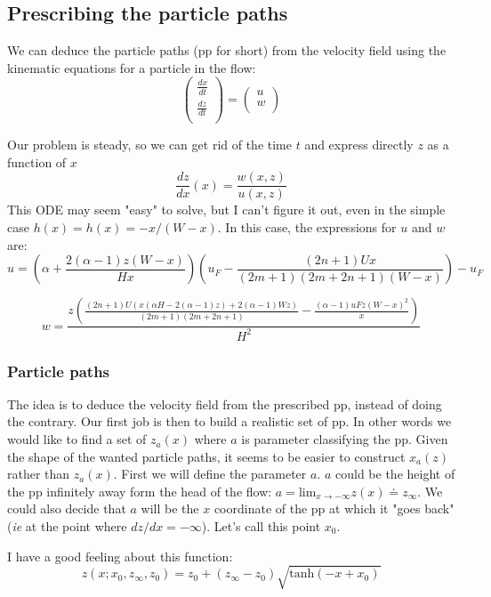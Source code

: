 \documentclass[11pt]{article}
\begin{document}
\subsection{Prescribing the particle paths}
We can deduce the particle paths (pp for short) from the velocity field using the kinematic equations for a particle in the flow:
\[
\begin{pmatrix}
	\frac{dx}{dt} \\
	\frac{dz}{dt} \\
\end{pmatrix}
=
\begin{pmatrix}
	u \\
	w \\
\end{pmatrix}
\]

Our problem is steady, so we can get rid of the time $t$ and express directly $z$ as a function of $x$ 
\[
\frac{dz}{dx}(x) = \frac{w(x, z)}{u(x, z)}
\]
This ODE may seem "easy" to solve, but I can't figure it out, even in the simple case $h(x) = h(x) = - x/ (W - x)$. In this case, the expressions for $u$ and $w$ are:
\[
 u =
 \left(
 \alpha 
 +\frac{2 (\alpha -1) z (W-x)}{H x}
 \right) 
 \left(
 u_F
 -\frac{(2 n+1) U x}{(2 m+1) (2 m+2 n+1) (W-x)}
 \right)-u_F
\]

\[
 w = 
 \frac{z \left(\frac{(2 n+1) U (x (\alpha  H-2 (\alpha -1) z)+2 (\alpha -1) W z)}{(2 m+1) (2 m+2 n+1)}-\frac{(\alpha -1) uF z (W-x)^2}{x}\right)}{H^2}
 \]
 
 
\subsubsection{Particle paths}

The idea is to deduce the velocity field from the prescribed pp, instead of doing the contrary.
Our first job is then to build a realistic set of pp. 
In other words we would like to find a set of $z_a(x)$ where $a$ is parameter classifying the pp.
Given the shape of the wanted particle paths, it seems to be easier to construct $x_a(z)$ rather than $z_a(x)$.
First we will define the parameter $a$. $a$ could be the height of the pp infinitely away form the head of the flow: $a = \text{lim}_{x \rightarrow -\infty} z(x) \doteq z_\infty$. We could also decide that $a$ will be the $x$ coordinate of the pp at which it "goes back" (\textit{ie} at the point where $dz/dx = - \infty$). 
Let's call this point $x_0$.

I have a good feeling about this function:
\[
z(x; x_0, z_\infty, z_0) = z_0 + (z_\infty - z_0) \sqrt {\text{tanh} (-x + x_0)}
\]
\end{document}
